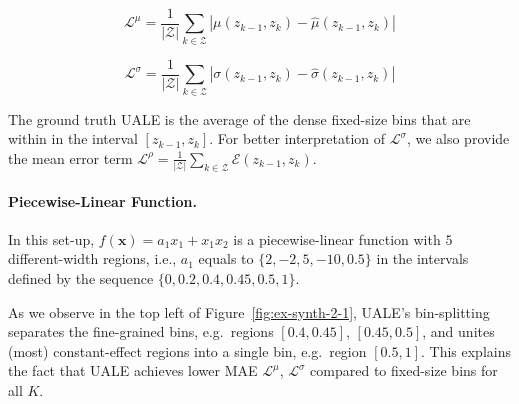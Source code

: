 \documentclass[twoside]{article}
\begin{document}
\begin{equation}
  \label{eq:eval_met_1}
  \mathcal{L}^{\mu} = \frac{1}{|\mathcal{Z}|} \sum_{k \in
  \mathcal{Z}} | \mu(z_{k-1}, z_k) - \hat{\mu}(z_{k-1}, z_k) |
\end{equation}


\begin{equation}
  \label{eq:eval_met_2}
  \mathcal{L}^{\sigma} = \frac{1}{|\mathcal{Z}|} \sum_{k \in
    \mathcal{Z}} | \sigma(z_{k-1}, z_k) - \hat{\sigma}(z_{k-1}, z_k) |
\end{equation}

The ground truth UALE is the average of the dense fixed-size bins that
are within in the interval \([z_{k-1}, z_k]\). For better
interpretation of \(\mathcal{L}^{\sigma}\), we also provide the mean
error term
\(\mathcal{L}^{\rho} = \frac{1}{|\mathcal{Z}|} \sum_{k \in
  \mathcal{Z}} \mathcal{E}(z_{k-1}, z_k) \).

\paragraph{Piecewise-Linear Function.}

In this set-up, \(f(\mathbf{x}) = a_1x_1 + x_1x_2\) is a
piecewise-linear function with \(5\) different-width regions, i.e.,
\(a_1\) equals to \(\{2, -2, 5, -10, 0.5\}\) in the intervals defined
by the sequence \(\{0, 0.2, 0.4, 0.45, 0.5, 1\}\).

As we observe in the top left of Figure~\ref{fig:ex-synth-2-1}, UALE's
bin-splitting separates the fine-grained bins, e.g.~regions
\([0.4, 0.45]\), \([0.45, 0.5]\), and unites (most) constant-effect
regions into a single bin, e.g.~region \([0.5, 1]\). This explains the
fact that UALE achieves lower MAE \(\mathcal{L}^{\mu}\),
\(\mathcal{L}^{\sigma}\) compared to fixed-size bins for all \(K\).


\end{document}
